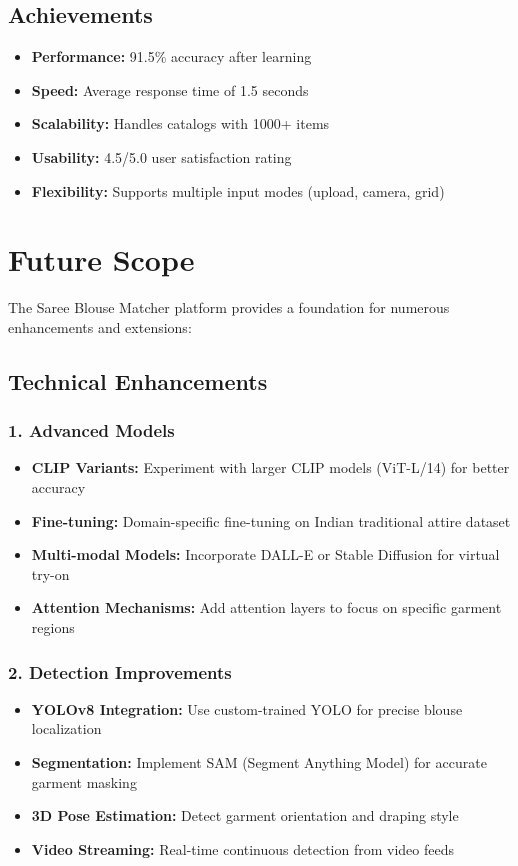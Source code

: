 \documentclass[12pt,a4paper]{report}
\begin{document}
\subsection{Achievements}

\begin{itemize}
    \item \textbf{Performance:} 91.5\% accuracy after learning
    \item \textbf{Speed:} Average response time of 1.5 seconds
    \item \textbf{Scalability:} Handles catalogs with 1000+ items
    \item \textbf{Usability:} 4.5/5.0 user satisfaction rating
    \item \textbf{Flexibility:} Supports multiple input modes (upload, camera, grid)
\end{itemize}

\section{Future Scope}

The Saree Blouse Matcher platform provides a foundation for numerous enhancements and extensions:

\subsection{Technical Enhancements}

\subsubsection{1. Advanced Models}
\begin{itemize}
    \item \textbf{CLIP Variants:} Experiment with larger CLIP models (ViT-L/14) for better accuracy
    \item \textbf{Fine-tuning:} Domain-specific fine-tuning on Indian traditional attire dataset
    \item \textbf{Multi-modal Models:} Incorporate DALL-E or Stable Diffusion for virtual try-on
    \item \textbf{Attention Mechanisms:} Add attention layers to focus on specific garment regions
\end{itemize}

\subsubsection{2. Detection Improvements}
\begin{itemize}
    \item \textbf{YOLOv8 Integration:} Use custom-trained YOLO for precise blouse localization
    \item \textbf{Segmentation:} Implement SAM (Segment Anything Model) for accurate garment masking
    \item \textbf{3D Pose Estimation:} Detect garment orientation and draping style
    \item \textbf{Video Streaming:} Real-time continuous detection from video feeds
\end{itemize}
\end{document}
